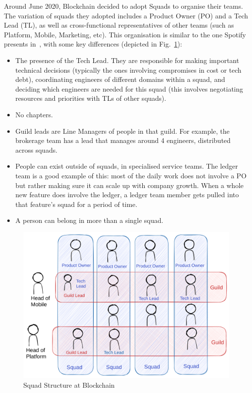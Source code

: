 \documentclass[conference]{IEEEtran}
\begin{document}
    Around June 2020, Blockchain decided to adopt Squads to organise their teams.
    The variation of squads they adopted includes a Product Owner (PO) and a Tech Lead (TL), as well as cross-functional representatives of other teams (such as Platform, Mobile, Marketing, etc).
    This organisation is similar to the one Spotify presents in~\cite{spotifySquads}, with some key differences (depicted in Fig.~\ref{fig:squad}):
    \begin{itemize}
        \item The presence of the Tech Lead.
        They are responsible for making important technical decisions (typically the ones involving compromises in cost or tech debt), coordinating engineers of different domains within a squad, and deciding which engineers are needed for this squad (this involves negotiating resources and priorities with TLs of other squads).
        \item No chapters.
        \item Guild leads are Line Managers of people in that guild.
        For example, the brokerage team has a lead that manages around 4 engineers, distributed across squads.
        \item People can exist outside of squads, in specialised service teams.
        The ledger team is a good example of this: most of the daily work does not involve a PO but rather making sure it can scale up with company growth.
        When a whole new feature does involve the ledger, a ledger team member gets pulled into that feature's squad for a period of time.
        \item A person can belong in more than a single squad.
    \end{itemize}

    \begin{figure}[h]
        \centering
        \includegraphics[width=0.94\columnwidth]{bcSquads}
        \caption{Squad Structure at Blockchain}
        \label{fig:squad}
    \end{figure}
\end{document}

